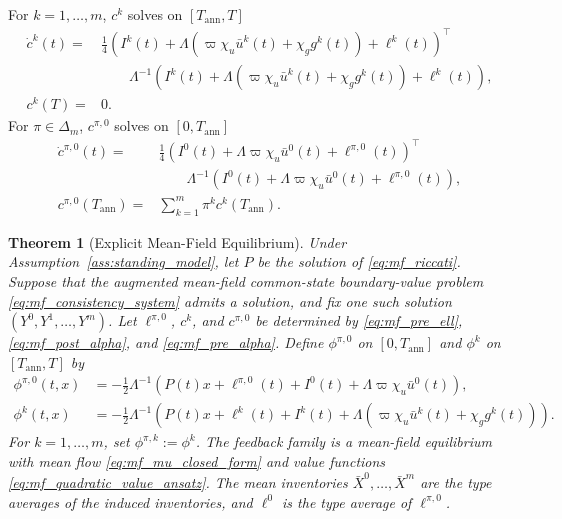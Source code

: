 \documentclass[12pt]{article}
\numberwithin{equation}{section}
\newtheorem{theorem}{Theorem}[section]
\theoremstyle{definition}
\begin{document}
\begin{itemize}
For \(k=1,\ldots,m\), \(c^k\) solves on
\([T_{\mathrm{ann}},T]\)
\begin{equation}\label{eq:mf_post_alpha}
\begin{aligned}
\dot c^k(t)
={}&
\frac14
\left(I^k(t)+\Lambda(\varpi\chi_u\bar u^k(t)+\chi_g g^k(t))+\ell^k(t)\right)^\top
\\
&\qquad
\Lambda^{-1}
\left(I^k(t)+\Lambda(\varpi\chi_u\bar u^k(t)+\chi_g g^k(t))+\ell^k(t)\right),
\\
c^k(T)={}&0.
\end{aligned}
\end{equation}
For \(\pi\in\Delta_m\), \(c^{\pi,0}\) solves on
\([0,T_{\mathrm{ann}}]\)
\begin{equation}\label{eq:mf_pre_alpha}
\begin{aligned}
\dot c^{\pi,0}(t)
={}&
\frac14
\left(I^0(t)+\Lambda\varpi\chi_u\bar u^0(t)+\ell^{\pi,0}(t)\right)^\top
\\
&\qquad
\Lambda^{-1}
\left(I^0(t)+\Lambda\varpi\chi_u\bar u^0(t)+\ell^{\pi,0}(t)\right),
\\
c^{\pi,0}(T_{\mathrm{ann}})
={}&\sum_{k=1}^m\pi^kc^k(T_{\mathrm{ann}}).
\end{aligned}
\end{equation}
\end{itemize}

\begin{theorem}[Explicit Mean-Field Equilibrium]\label{thm:mf_solution}
Under Assumption~\ref{ass:standing_model}, let \(P\) be the solution of
\eqref{eq:mf_riccati}. Suppose that the augmented mean-field common-state
boundary-value problem
\eqref{eq:mf_consistency_system} admits a solution, and fix one such solution
\((Y^0,Y^1,\ldots,Y^m)\). Let \(\ell^{\pi,0}\), \(c^k\), and
\(c^{\pi,0}\) be determined by \eqref{eq:mf_pre_ell},
\eqref{eq:mf_post_alpha}, and \eqref{eq:mf_pre_alpha}.
Define \(\phi^{\pi,0}\) on \([0,T_{\mathrm{ann}}]\) and
\(\phi^{k}\) on \([T_{\mathrm{ann}},T]\) by
\begin{subequations}\label{eq:mf_equilibrium_feedbacks}
\begin{align}
\phi^{\pi,0}(t,x)
&=
-\frac12\Lambda^{-1}
\left(P(t)x+\ell^{\pi,0}(t)+I^0(t)+\Lambda\varpi\chi_u\bar u^0(t)\right),
\label{eq:mf_pre_feedback}\\
\phi^{k}(t,x)
&=
-\frac12\Lambda^{-1}
\left(P(t)x+\ell^k(t)+I^k(t)
+\Lambda(\varpi\chi_u\bar u^k(t)+\chi_g g^k(t))\right).
\label{eq:mf_post_feedback}
\end{align}
\end{subequations}
For \(k=1,\ldots,m\), set \(\phi^{\pi,k}:=\phi^{k}\). The feedback
family is a mean-field equilibrium with mean flow
\eqref{eq:mf_mu_closed_form} and value functions
\eqref{eq:mf_quadratic_value_ansatz}. The mean inventories
\(\bar X^0,\ldots,\bar X^m\) are the type averages of the induced inventories,
and \(\ell^0\) is the type average of \(\ell^{\pi,0}\).
\end{theorem}
\end{document}
